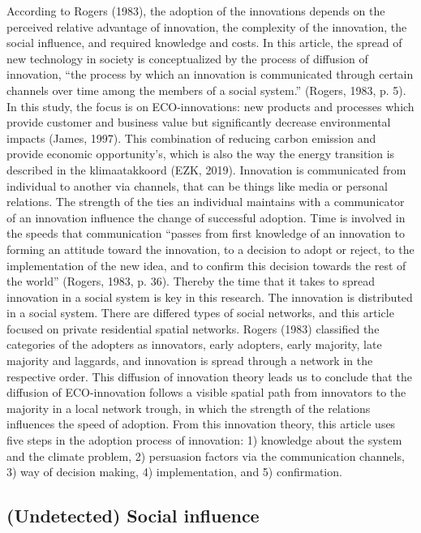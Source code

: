 \documentclass[man,floatsintext]{apa6}
\begin{document}
According to Rogers (1983), the adoption of the innovations depends on
the perceived relative advantage of innovation, the complexity of the
innovation, the social influence, and required knowledge and costs. In
this article, the spread of new technology in society is conceptualized
by the process of diffusion of innovation, \enquote{the process by which
an innovation is communicated through certain channels over time among
the members of a social system.} (Rogers, 1983, p. 5). In this study,
the focus is on ECO-innovations: new products and processes which
provide customer and business value but significantly decrease
environmental impacts (James, 1997). This combination of reducing carbon
emission and provide economic opportunity's, which is also the way the
energy transition is described in the klimaatakkoord (EZK, 2019).
Innovation is communicated from individual to another via channels, that
can be things like media or personal relations. The strength of the ties
an individual maintains with a communicator of an innovation influence
the change of successful adoption. Time is involved in the speeds that
communication \enquote{passes from first knowledge of an innovation to
forming an attitude toward the innovation, to a decision to adopt or
reject, to the implementation of the new idea, and to confirm this
decision towards the rest of the world} (Rogers, 1983, p. 36). Thereby
the time that it takes to spread innovation in a social system is key in
this research. The innovation is distributed in a social system. There
are differed types of social networks, and this article focused on
private residential spatial networks. Rogers (1983) classified the
categories of the adopters as innovators, early adopters, early
majority, late majority and laggards, and innovation is spread through a
network in the respective order. This diffusion of innovation theory
leads us to conclude that the diffusion of ECO-innovation follows a
visible spatial path from innovators to the majority in a local network
trough, in which the strength of the relations influences the speed of
adoption. From this innovation theory, this article uses five steps in
the adoption process of innovation: 1) knowledge about the system and
the climate problem, 2) persuasion factors via the communication
channels, 3) way of decision making, 4) implementation, and 5)
confirmation.

\subsection{(Undetected) Social
influence}\label{undetected-social-influence}
\end{document}
